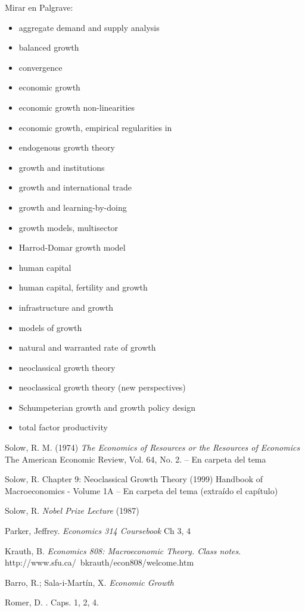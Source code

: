 \documentclass{nuevotema}
\begin{document}
Mirar en Palgrave:
\begin{itemize}
	\item aggregate demand and supply analysis
	\item balanced growth
	\item convergence
	\item economic growth 
	\item economic growth non-linearities
	\item economic growth, empirical regularities in 
	\item endogenous growth theory 
	\item growth and institutions
	\item growth and international trade
	\item growth and learning-by-doing 
	\item growth models, multisector
    \item Harrod-Domar growth model
	\item human capital
	\item human capital, fertility and growth
	\item infrastructure and growth
    \item models of growth
    \item natural and warranted rate of growth
	\item neoclassical growth theory 
	\item neoclassical growth theory (new perspectives) 
	\item Schumpeterian growth and growth policy design 
	\item total factor productivity 	
\end{itemize}


Solow, R. M. (1974) \textit{The Economics of Resources or the Resources of Economics} The American Economic Review, Vol. 64, No. 2. -- En carpeta del tema

Solow, R. {Chapter 9: Neoclassical Growth Theory} (1999) Handbook of Macroeconomics - Volume 1A -- En carpeta del tema (extraído el capítulo)

Solow, R. \textit{Nobel Prize Lecture} (1987)

Parker, Jeffrey. \textit{Economics 314 Coursebook} Ch 3, 4

Krauth, B. \textit{Economics 808: Macroeconomic Theory. Class notes}. http://www.sfu.ca/~bkrauth/econ808/welcome.htm

Barro, R.; Sala-i-Martín, X. \textit{Economic Growth}

Romer, D. . Caps. 1, 2, 4.
\end{document}
